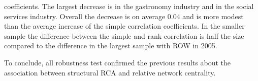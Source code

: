 coefficients. The largest decrease is in the gastronomy industry and in the social services industry.  Overall the decrease is on average 0.04 and is more modest  than the average increase of the simple correlation coefficients.  In the smaller sample the difference between the simple and rank correlation is half the size compared to the difference in the largest sample with ROW in 2005.\par  To conclude, all robustness test confirmed the previous results about the association between structural RCA and relative network centrality.
